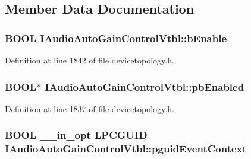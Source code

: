 \subsection{Member Data Documentation}
\subsubsection[{\texorpdfstring{b\+Enable}{bEnable}}]{ {\bf B\+O\+OL} I\+Audio\+Auto\+Gain\+Control\+Vtbl\+::b\+Enable}\hypertarget{struct_i_audio_auto_gain_control_vtbl_a8d1a4fb5d1cf418b17f4c57b4659d23d}{}\label{struct_i_audio_auto_gain_control_vtbl_a8d1a4fb5d1cf418b17f4c57b4659d23d}


Definition at line 1842 of file devicetopology.\+h.

\subsubsection[{\texorpdfstring{pb\+Enabled}{pbEnabled}}]{ {\bf B\+O\+OL}$\ast$ I\+Audio\+Auto\+Gain\+Control\+Vtbl\+::pb\+Enabled}\hypertarget{struct_i_audio_auto_gain_control_vtbl_a59967e9aa7bee24c953a923653bd036b}{}\label{struct_i_audio_auto_gain_control_vtbl_a59967e9aa7bee24c953a923653bd036b}


Definition at line 1837 of file devicetopology.\+h.

\subsubsection[{\texorpdfstring{pguid\+Event\+Context}{pguidEventContext}}]{ {\bf B\+O\+OL} {\bf \+\_\+\+\_\+in\+\_\+opt} {\bf L\+P\+C\+G\+U\+ID} I\+Audio\+Auto\+Gain\+Control\+Vtbl\+::pguid\+Event\+Context}\hypertarget{struct_i_audio_auto_gain_control_vtbl_a57c49fbfcd7452feba75e6d7cdfaf2ef}{}\label{struct_i_audio_auto_gain_control_vtbl_a57c49fbfcd7452feba75e6d7cdfaf2ef}


